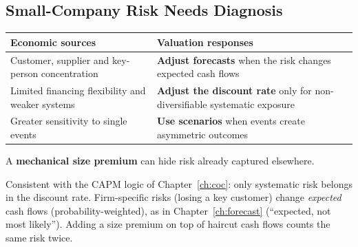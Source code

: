 \subsection{Small-Company Risk Needs Diagnosis}
\begin{center}
\small
\begin{tabular}{@{}p{6.5cm}p{7.5cm}@{}}
\toprule
\textbf{Economic sources} & \textbf{Valuation responses}\\
\midrule
Customer, supplier and key-person concentration & \textbf{Adjust forecasts} when the risk changes expected cash flows\\
Limited financing flexibility and weaker systems & \textbf{Adjust the discount rate} only for non-diversifiable systematic exposure\\
Greater sensitivity to single events & \textbf{Use scenarios} when events create asymmetric outcomes\\
\bottomrule
\end{tabular}
\end{center}
\begin{keybox}
A \textbf{mechanical size premium} can hide risk already captured elsewhere.
\end{keybox}
\begin{addbox}
Consistent with the CAPM logic of Chapter~\ref{ch:coc}: only systematic risk belongs in the discount rate. Firm-specific risks (losing a key customer) change \emph{expected} cash flows (probability-weighted), as in Chapter~\ref{ch:forecast} (``expected, not most likely''). Adding a size premium on top of haircut cash flows counts the same risk twice.
\end{addbox}

